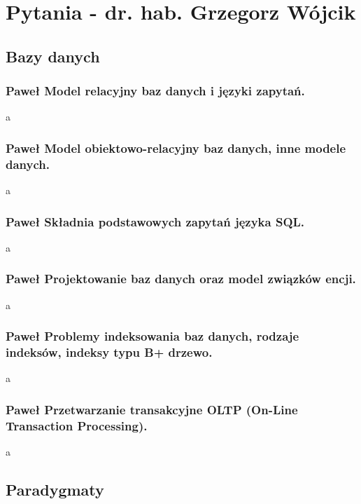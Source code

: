 \documentclass[a4paper,12pt,oneside]{book}
\begin{document}
	\chapter{Pytania - dr. hab. Grzegorz Wójcik}
	
		\section{Bazy danych}
			\subsection{\color{green} Paweł \color{red}Model relacyjny baz danych i języki zapytań.}
				a
			\newpage\subsection{\color{green} Paweł \color{red}Model obiektowo-relacyjny baz danych, inne modele danych.}
				a
			\newpage\subsection{\color{green} Paweł \color{red}Składnia podstawowych zapytań języka SQL.}
				a
			\newpage\subsection{\color{green} Paweł \color{red}Projektowanie baz danych oraz model związków encji.}
				a
			\newpage\subsection{\color{green} Paweł \color{red}Problemy indeksowania baz danych, rodzaje indeksów, indeksy typu B+ drzewo.}
				a
			\newpage\subsection{\color{green} Paweł \color{red}Przetwarzanie transakcyjne OLTP (On-Line Transaction Processing).}
				a
		
		\newpage\section{Paradygmaty}
\end{document}
